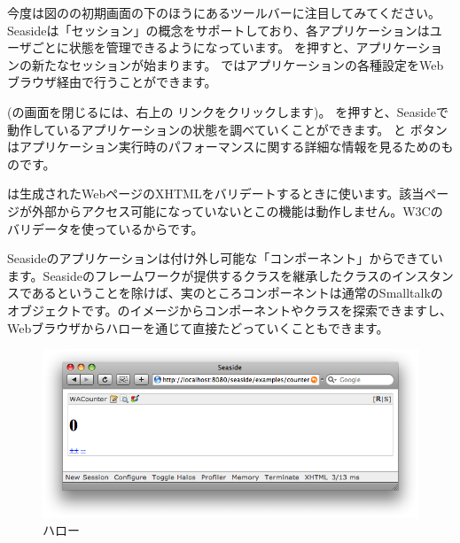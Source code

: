 \documentclass[a4paper,10pt,twoside]{book}
\begin{document}
今度は図のの初期画面の下のほうにあるツールバーに注目してみてください。
Seasideは「セッション」の概念をサポートしており、各アプリケーションはユーザごとに状態を管理できるようになっています。
 を押すと、アプリケーションの新たなセッションが始まります。
 ではアプリケーションの各種設定をWebブラウザ経由で行うことができます。

(の画面を閉じるには、右上の  リンクをクリックします)。
 を押すと、Seasideで動作しているアプリケーションの状態を調べていくことができます。
 と  ボタンはアプリケーション実行時のパフォーマンスに関する詳細な情報を見るためのものです。

 は生成されたWebページのXHTMLをバリデートするときに使います。該当ページが外部からアクセス可能になっていないとこの機能は動作しません。W3Cのバリデータを使っているからです。

Seasideのアプリケーションは付け外し可能な「コンポーネント」からできています。Seasideのフレームワークが提供するクラスを継承したクラスのインスタンスであるということを除けば、実のところコンポーネントは通常のSmalltalkのオブジェクトです。\pharo のイメージからコンポーネントやクラスを探索できますし、Webブラウザからハローを通じて直接たどっていくこともできます。

\begin{figure}[ht]
\begin{center}
\includegraphics[width=\textwidth]{counterHalos}
\caption{ハロー}
\end{center}
\end{figure}

\end{document}
